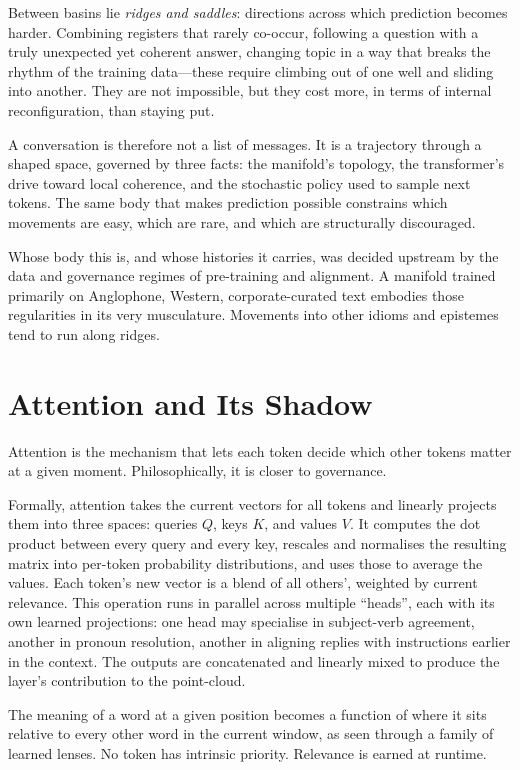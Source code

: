 \documentclass[12pt,a4paper]{article}
\begin{document}
Between basins lie \emph{ridges and saddles}: directions across which prediction becomes harder. Combining registers that rarely co-occur, following a question with a truly unexpected yet coherent answer, changing topic in a way that breaks the rhythm of the training data---these require climbing out of one well and sliding into another. They are not impossible, but they cost more, in terms of internal reconfiguration, than staying put.

A conversation is therefore not a list of messages. It is a trajectory through a shaped space, governed by three facts: the manifold's topology, the transformer's drive toward local coherence, and the stochastic policy used to sample next tokens. The same body that makes prediction possible constrains which movements are easy, which are rare, and which are structurally discouraged.

Whose body this is, and whose histories it carries, was decided upstream by the data and governance regimes of pre-training and alignment. A manifold trained primarily on Anglophone, Western, corporate-curated text embodies those regularities in its very musculature. Movements into other idioms and epistemes tend to run along ridges.

\section{Attention and Its Shadow}

Attention is the mechanism that lets each token decide which other tokens matter at a given moment. Philosophically, it is closer to governance.

Formally, attention takes the current vectors for all tokens and linearly projects them into three spaces: queries $Q$, keys $K$, and values $V$. It computes the dot product between every query and every key, rescales and normalises the resulting matrix into per-token probability distributions, and uses those to average the values. Each token's new vector is a blend of all others', weighted by current relevance. This operation runs in parallel across multiple ``heads'', each with its own learned projections: one head may specialise in subject-verb agreement, another in pronoun resolution, another in aligning replies with instructions earlier in the context. The outputs are concatenated and linearly mixed to produce the layer's contribution to the point-cloud.

The meaning of a word at a given position becomes a function of where it sits relative to every other word in the current window, as seen through a family of learned lenses. No token has intrinsic priority. Relevance is earned at runtime.
\end{document}
